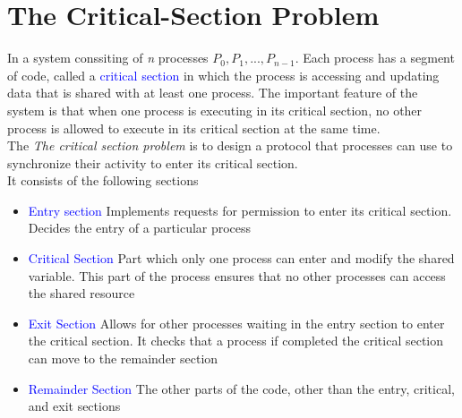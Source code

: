 \documentclass{book/custombook}
\begin{document}
        \section{The Critical-Section Problem}
            In a system conssiting of \textit{n} processes \textit{$P_0, P_1, ... , P_{n-1}$}.
            Each process has a segment of code, called a \textcolor{blue}{critical section} in which
            the process is accessing and updating data that is shared with at least one process.
            The important feature of the system is that when one process is executing in its critical 
            section, no other process is allowed to execute in its critical section at the same time.\\
            The \textit{The critical section problem} is to design a protocol that processes can use to
            synchronize their activity to enter its critical section.\\
            It consists of the following sections
            \begin{itemize}
                \item \textcolor{blue}{Entry section} Implements requests for permission to enter its critical
                    section. Decides the entry of a particular process
                \item \textcolor{blue}{Critical Section} Part which only one process can enter and modify the
                    shared variable. This part of the process ensures that no other processes can access the 
                    shared resource
                \item \textcolor{blue}{Exit Section} Allows for other processes waiting in the entry section to
                    enter the critical section. It checks that a process if completed the critical section can move
                    to the remainder section
                \item \textcolor{blue}{Remainder Section} The other parts of the code, other than the entry, critical,
                    and exit sections
            \end{itemize}
\end{document}
